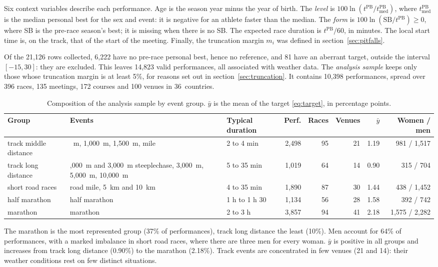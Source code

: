 \documentclass[11pt,a4paper]{article}
\newcommand{\PB}{\mathrm{PB}}
\begin{document}
Six context variables describe each performance. Age is the season year minus the year of birth. The \emph{level} is
$100\ln(t^{\PB}/t^{\PB}_{\text{med}})$, where $t^{\PB}_{\text{med}}$ is the median personal best for the sex and
event: it is negative for an athlete faster than the median. The \emph{form} is $100\ln(\text{SB}/t^{\PB}) \geq 0$,
where SB is the pre-race season's best; it is missing when there is no SB. The expected race duration is $t^{\PB}/60$,
in minutes. The local start time is, on the track, that of the start of the meeting. Finally, the truncation margin
$m_i$ was defined in section~\ref{sec:pitfalls}.

Of the 21,126 rows collected, 6,222 have no pre-race personal best, hence no reference, and 81 have an aberrant target,
outside the interval $[-15, 30]$: they are excluded. This leaves 14,823 valid performances, all associated with
weather data. The \emph{analysis sample} keeps only those whose truncation margin is at least 5\%, for reasons set out
in section~\ref{sec:truncation}. It contains 10,398 performances, spread over 396 races, 135 meetings, 172 courses and
100 venues in 36~countries.

\begin{table}[htbp]
\centering
\small
\caption{Composition of the analysis sample by event group. $\bar y$ is the mean of the target \eqref{eq:target}, in
percentage points.}
\label{tab:groups}
\begin{tabular}{@{}l>{\raggedright\arraybackslash}p{4.4cm}lrrrrr@{}}
\toprule
Group & Events & Typical duration & Perf. & Races & Venues & $\bar y$ & Women / men \\
\midrule
track middle distance & 800~m, 1,000~m, 1,500~m, mile & 2 to 4 min & 2,498 & 95 & 21 & 1.19 & 981 / 1,517 \\
track long distance & 2,000~m and 3,000~m steeplechase, 3,000~m, 5,000~m, 10,000~m & 5 to 35 min & 1,019 & 64 & 14 &
0.90 & 315 / 704 \\
short road races & road mile, 5~km and 10~km & 4 to 35 min & 1,890 & 87 & 30 & 1.44 & 438 / 1,452 \\
half marathon & half marathon & 1 h to 1 h 30 & 1,134 & 56 & 28 & 1.58 & 392 / 742 \\
marathon & marathon & 2 to 3 h & 3,857 & 94 & 41 & 2.18 & 1,575 / 2,282 \\
\bottomrule
\end{tabular}
\end{table}

The marathon is the most represented group (37\% of performances), track long distance the least (10\%). Men account
for 64\% of performances, with a marked imbalance in short road races, where there are three men for every woman.
$\bar y$ is positive in all groups and increases from track long distance (0.90\%) to the marathon (2.18\%). Track
events are concentrated in few venues (21 and 14): their weather conditions rest on few distinct situations.
\end{document}

